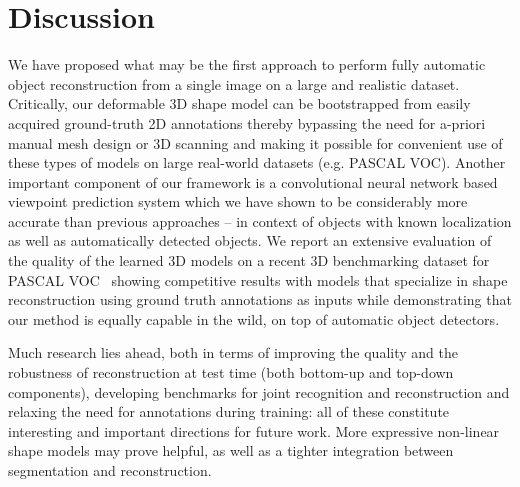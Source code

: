 \section{Discussion}
We have proposed what may be the first approach to perform fully automatic object reconstruction from a single image on a large and realistic dataset. Critically, our deformable 3D shape model can be bootstrapped from easily acquired ground-truth 2D annotations thereby bypassing the need for a-priori manual mesh design or 3D scanning and making it possible for convenient use of these types of models on large real-world datasets (e.g. PASCAL VOC). Another important component of our framework is a convolutional neural network based viewpoint prediction system which we have shown to be considerably more accurate than previous approaches -- in context of objects with known localization as well as automatically detected objects. We report an extensive evaluation of the quality of the learned 3D models on a recent 3D benchmarking dataset for PASCAL VOC~\cite{pascal3d} showing competitive results with models that specialize in shape reconstruction using ground truth annotations as inputs while demonstrating that our method is equally capable in the wild, on top of automatic object detectors. %


Much research lies ahead, both in terms of improving the quality and the robustness of reconstruction at test time (both bottom-up and top-down components), developing benchmarks for joint recognition and reconstruction and relaxing the need for annotations during training: all of these constitute interesting and important directions for future work. More expressive non-linear shape models \cite{wu20143d} may prove helpful, as well as a tighter integration between segmentation and reconstruction. %


